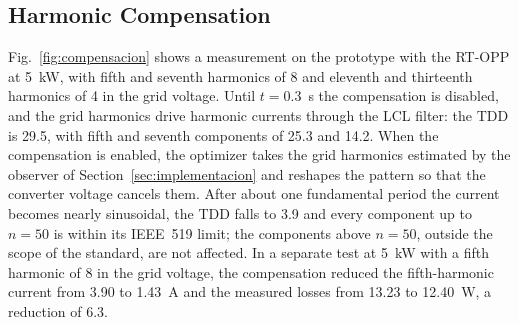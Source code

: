 \documentclass[conference]{IEEEtran}
\newcommand{\pct}{\text{\char`\%}}
\newcommand{\old}[1]{\par\smallskip\noindent{\color{gray}\footnotesize
    \textbf{[ANTES]} #1}\par\smallskip}
\renewcommand{\old}[1]{}       %
\begin{document}
\subsection{Harmonic Compensation}
\label{subsec:compensacion}

Fig.~\ref{fig:compensacion} shows a measurement on the prototype
with the RT-OPP at 5~kW, with fifth and seventh harmonics of 8\pct{} and
eleventh and thirteenth harmonics of 4\pct{} in the grid voltage. Until
$t = 0.3$~s the compensation is disabled, and the grid harmonics drive
harmonic currents through the LCL filter: the TDD is 29.5\pct{}, with fifth
and seventh components of 25.3\pct{} and 14.2\pct{}. When the compensation
is enabled, the optimizer takes the grid harmonics estimated by the observer
of Section~\ref{sec:implementacion} and reshapes the pattern so that the
converter voltage cancels them. After about one fundamental period the
current becomes nearly sinusoidal, the TDD falls to 3.9\pct{} and every
component up to $n = 50$ is within its IEEE~519 limit; the components above
$n = 50$, outside the scope of the standard, are not affected. In a separate
test at 5~kW with a fifth harmonic of 8\pct{} in the grid voltage, the
compensation reduced the fifth-harmonic current from 3.90 to 1.43~A and the
measured losses from 13.23 to 12.40~W, a reduction of 6.3\pct{}.
\old{In a separate test at 5~kW with a fifth harmonic of 8\pct{} in the grid
voltage, enabling the compensation reduced the measured losses by
5\pct{}.}

\end{document}
